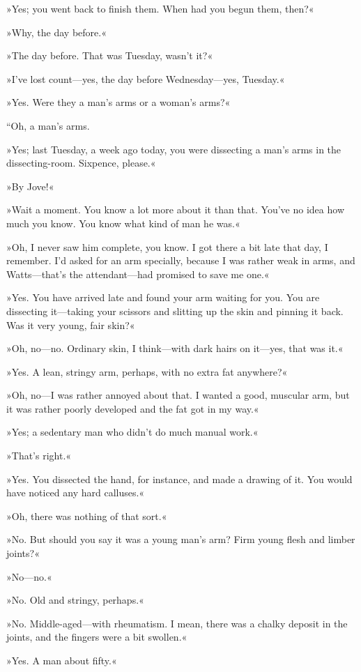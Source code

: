 »Yes; you went back to finish them. When had you begun them, then?«

»Why, the day before.«

»The day before. That was Tuesday, wasn't it?«

»I've lost count—yes, the day before Wednesday—yes, Tuesday.«

»Yes. Were they a man's arms or a woman's arms?«

“Oh, a man's arms.

»Yes; last Tuesday, a week ago today, you were dissecting a man's arms in the dissecting-room. Sixpence, please.«

»By Jove!«

»Wait a moment. You know a lot more about it than that. You've no idea how much you know. You know what kind of man he was.«

»Oh, I never saw him complete, you know. I got there a bit late that day, I remember. I'd asked for an arm specially, because I was rather weak in arms, and Watts—that's the attendant—had promised to save me one.«

»Yes. You have arrived late and found your arm waiting for you. You are dissecting it—taking your scissors and slitting up the skin and pinning it back. Was it very young, fair skin?«

»Oh, no—no. Ordinary skin, I think—with dark hairs on it—yes, that was it.«

»Yes. A lean, stringy arm, perhaps, with no extra fat anywhere?«

»Oh, no—I was rather annoyed about that. I wanted a good, muscular arm, but it was rather poorly developed and the fat got in my way.«

»Yes; a sedentary man who didn't do much manual work.«

»That's right.«

»Yes. You dissected the hand, for instance, and made a drawing of it. You would have noticed any hard calluses.«

»Oh, there was nothing of that sort.«

»No. But should you say it was a young man's arm? Firm young flesh and limber joints?«

»No—no.«

»No. Old and stringy, perhaps.«

»No. Middle-aged—with rheumatism. I mean, there was a chalky deposit in the joints, and the fingers were a bit swollen.«

»Yes. A man about fifty.«

